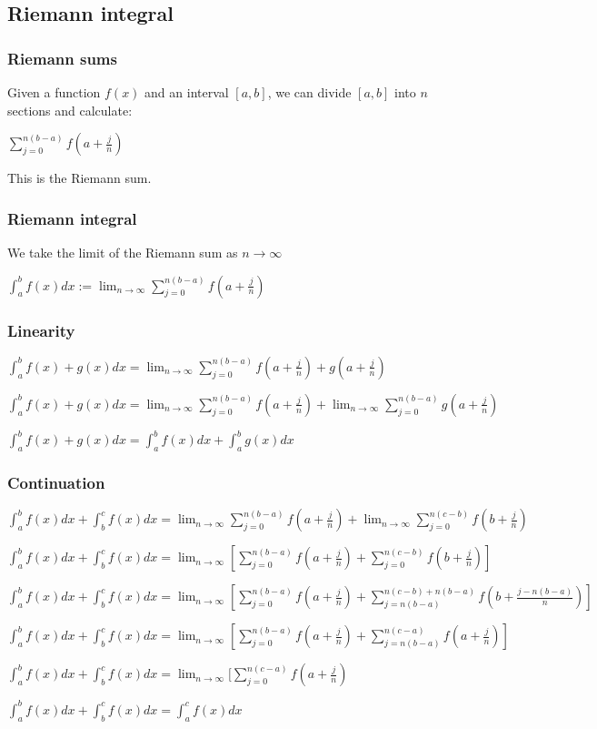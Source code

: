 
\subsection{Riemann integral}

\subsubsection{Riemann sums}

Given a function \(f(x)\) and an interval \([a,b]\), we can divide \([a,b]\) into \(n\) sections and calculate:

\(\sum_{j=0}^{n(b-a)}f(a+\frac{j}{n})\)

This is the Riemann sum.

\subsubsection{Riemann integral}

We take the limit of the Riemann sum as \(n\rightarrow \infty\)

\(\int_a^b f(x)dx:= \lim_{n\rightarrow \infty } \sum_{j=0}^{n(b-a)} f(a+ \frac{j}{n} )\)

\subsubsection{Linearity}

\(\int_a^bf(x)+g(x)dx=\lim_{n\rightarrow \infty }\sum_{j=0}^{n(b-a)}f(a+\frac{j}{n})+g(a+\frac{j}{n})\)

\(\int_a^bf(x)+g(x)dx=\lim_{n\rightarrow \infty }\sum_{j=0}^{n(b-a)}f(a+\frac{j}{n})+\lim_{n\rightarrow \infty }\sum_{j=0}^{n(b-a)}g(a+\frac{j}{n})\)

\(\int_a^bf(x)+g(x)dx=\int_a^bf(x)dx +\int_a^bg(x)dx\)

\subsubsection{Continuation}

\(\int_a^bf(x)dx+\int_b^cf(x)dx=\lim_{n\rightarrow \infty }\sum_{j=0}^{n(b-a)}f(a+\frac{j}{n})+\lim_{n\rightarrow \infty }\sum_{j=0}^{n(c-b)}f(b+\frac{j}{n})\)

\(\int_a^bf(x)dx+\int_b^cf(x)dx=\lim_{n\rightarrow \infty }[\sum_{j=0}^{n(b-a)}f(a+\frac{j}{n})+\sum_{j=0}^{n(c-b)}f(b+\frac{j}{n})]\)

\(\int_a^bf(x)dx+\int_b^cf(x)dx=\lim_{n\rightarrow \infty }[\sum_{j=0}^{n(b-a)}f(a+\frac{j}{n})+\sum_{j=n(b-a)}^{n(c-b)+n(b-a)}f(b+\frac{j-n(b-a)}{n})]\)

\(\int_a^bf(x)dx+\int_b^cf(x)dx=\lim_{n\rightarrow \infty }[\sum_{j=0}^{n(b-a)}f(a+\frac{j}{n})+\sum_{j=n(b-a)}^{n(c-a)}f(a+\frac{j}{n})]\)

\(\int_a^bf(x)dx+\int_b^cf(x)dx=\lim_{n\rightarrow \infty }[\sum_{j=0}^{n(c-a)}f(a+\frac{j}{n})\)

\(\int_a^bf(x)dx+\int_b^cf(x)dx=\int_a^cf(x)dx\)

